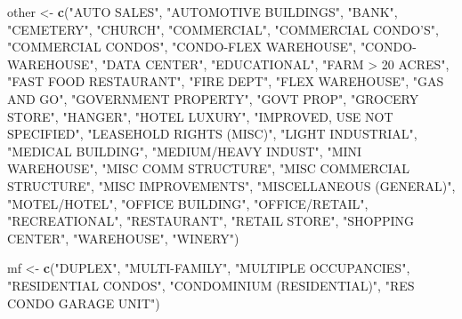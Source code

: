 \documentclass[]{article}
\newenvironment{Shaded}{\begin{snugshade}}{\end{snugshade}}
\newcommand{\KeywordTok}[1]{\textcolor[rgb]{0.13,0.29,0.53}{\textbf{#1}}}
\newcommand{\StringTok}[1]{\textcolor[rgb]{0.31,0.60,0.02}{#1}}
\newcommand{\NormalTok}[1]{#1}
\begin{document}
\begin{Shaded}
\begin{Highlighting}[]
\NormalTok{other <-}\StringTok{ }\KeywordTok{c}\NormalTok{(}\StringTok{"AUTO SALES"}\NormalTok{,}
                \StringTok{"AUTOMOTIVE BUILDINGS"}\NormalTok{,}
                \StringTok{"BANK"}\NormalTok{,}
                \StringTok{"CEMETERY"}\NormalTok{,}
                \StringTok{"CHURCH"}\NormalTok{,}
                \StringTok{"COMMERCIAL"}\NormalTok{,}
                \StringTok{"COMMERCIAL CONDO'S"}\NormalTok{,}
                \StringTok{"COMMERCIAL CONDOS"}\NormalTok{,}
                \StringTok{"CONDO-FLEX WAREHOUSE"}\NormalTok{,}
                \StringTok{"CONDO-WAREHOUSE"}\NormalTok{,}
                \StringTok{"DATA CENTER"}\NormalTok{,}
                \StringTok{"EDUCATIONAL"}\NormalTok{,}
                \StringTok{"FARM > 20 ACRES"}\NormalTok{,}
                \StringTok{"FAST FOOD RESTAURANT"}\NormalTok{,}
                \StringTok{"FIRE DEPT"}\NormalTok{,}
                \StringTok{"FLEX WAREHOUSE"}\NormalTok{,}
                \StringTok{"GAS AND GO"}\NormalTok{,}
                \StringTok{"GOVERNMENT PROPERTY"}\NormalTok{,}
                \StringTok{"GOVT PROP"}\NormalTok{,}
                \StringTok{"GROCERY STORE"}\NormalTok{,}
                \StringTok{"HANGER"}\NormalTok{,}
                \StringTok{"HOTEL LUXURY"}\NormalTok{,}
                \StringTok{"IMPROVED, USE NOT SPECIFIED"}\NormalTok{,}
                \StringTok{"LEASEHOLD RIGHTS (MISC)"}\NormalTok{,}
                \StringTok{"LIGHT INDUSTRIAL"}\NormalTok{,}
                \StringTok{"MEDICAL BUILDING"}\NormalTok{,}
                \StringTok{"MEDIUM/HEAVY INDUST"}\NormalTok{,}
                \StringTok{"MINI WAREHOUSE"}\NormalTok{,}
                \StringTok{"MISC COMM STRUCTURE"}\NormalTok{,}
                \StringTok{"MISC COMMERCIAL STRUCTURE"}\NormalTok{,}
                \StringTok{"MISC IMPROVEMENTS"}\NormalTok{,}
                \StringTok{"MISCELLANEOUS (GENERAL)"}\NormalTok{,}
                \StringTok{"MOTEL/HOTEL"}\NormalTok{,}
                \StringTok{"OFFICE BUILDING"}\NormalTok{,}
                \StringTok{"OFFICE/RETAIL"}\NormalTok{,}
                \StringTok{"RECREATIONAL"}\NormalTok{,}
                \StringTok{"RESTAURANT"}\NormalTok{,}
                \StringTok{"RETAIL STORE"}\NormalTok{,}
                \StringTok{"SHOPPING CENTER"}\NormalTok{, }
                \StringTok{"WAREHOUSE"}\NormalTok{,}
                \StringTok{"WINERY"}\NormalTok{)}

\NormalTok{mf <-}\StringTok{ }\KeywordTok{c}\NormalTok{(}\StringTok{"DUPLEX"}\NormalTok{,}
        \StringTok{"MULTI-FAMILY"}\NormalTok{,}
        \StringTok{"MULTIPLE OCCUPANCIES"}\NormalTok{,}
        \StringTok{"RESIDENTIAL CONDOS"}\NormalTok{,}
        \StringTok{"CONDOMINIUM (RESIDENTIAL)"}\NormalTok{,}
        \StringTok{"RES CONDO GARAGE UNIT"}\NormalTok{)}


\end{Highlighting}
\end{Shaded}
\end{document}

